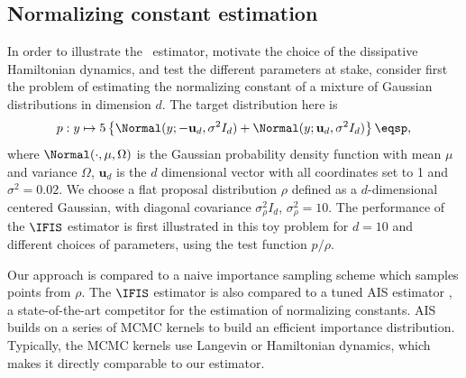 \subsection{Normalizing constant estimation}
\label{subsec:estim_constant}
In order to illustrate the \IFIS\, estimator, motivate the choice of the dissipative Hamiltonian dynamics, and test the different parameters at stake, consider first the problem of estimating the normalizing constant of a mixture of Gaussian distributions in dimension $d$. The target distribution here is 
\[
p: y \mapsto5\left\{\Normal(y;-\mathbf{u}_d, \sigma^2 I_d) +  \Normal(y;\mathbf{u}_d, \sigma^2 I_d)\right\}\eqsp,
\]
where $\Normal(\cdot,\mu,\Omega)$ is the Gaussian probability density function with mean $\mu$ and variance $\Omega$, $\mathbf{u}_d$ is the $d$ dimensional vector with all coordinates set to 1 and $\sigma^2 = 0.02$. We choose a flat proposal distribution $\rho$ defined as a $d$-dimensional centered Gaussian, with diagonal covariance $\sigma^2_\rho I_d$, $\sigma^2_\rho=10$. %
The performance of the $\IFIS$ estimator is first illustrated in this toy problem for $d=10$ and different choices of parameters, using the test function $p/\rho$. 

Our approach is compared to a naive importance sampling scheme which samples points from  $\rho$. %
The $\IFIS$ estimator is also compared to a  tuned AIS estimator \cite{neal:2001}, a state-of-the-art competitor for the estimation of normalizing constants.
AIS builds on a series of MCMC kernels to build an efficient importance distribution. Typically, the MCMC kernels use Langevin or Hamiltonian dynamics, which makes it directly comparable to our estimator.

